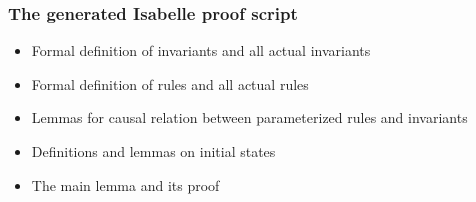\documentclass{beamer}
\begin{document}
\begin{frame}\frametitle{ {\sf The generated Isabelle proof script}}


\begin{itemize}
\item Formal definition of   invariants and all actual invariants  

\item Formal definition of   rules and all actual rules 


\item Lemmas for causal relation between parameterized rules and invariants

\item Definitions and lemmas on initial states

\item The main lemma and its proof

\end{itemize}
 \end{frame} 
 
\end{document}
